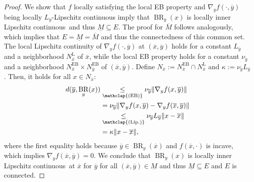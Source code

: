 \documentclass{article}
\newcommand{\lilc}{locally inner Lipschitz continuous}
\DeclareMathOperator{\BR}{BR}
\begin{document}
\begin{proof}
    We show that $f$ locally satisfying the local EB property and $\nabla_y f(\cdot,\overline{y})$ being locally $L_{\overline{y}}$-Lipschitz continuous imply that $\BR_y(x)$ is \lilc\ and thus $\underline{M}\subseteq E$. The proof for $\overline{M}$ follows analogously, which implies that $E=\underline{M}=\overline{M}$ and thus the connectedness of this common set. The local Lipschitz continuity of $\nabla_y f(\cdot,\overline{y})$ at $(\overline{x},\overline{y})$ holds for a constant $L_{\overline{y}}$ and a neighborhood $N_{\overline{x}}^{\text{L}}$ of $\overline{x}$, while the local EB property holds for a constant $\nu_{\overline{y}}$ and a neighborhood $N_{\overline{x}}^{\text{EB}}\times N_{\overline{y}}^{\text{EB}}$ of $(\overline{x},\overline{y})$. Define $N_{\overline{x}}:=N_{\overline{x}}^{\text{EB}}\cap N_{\overline{x}}^{\text{L}}$ and $\kappa:= \nu_{\overline{y}} L_{\overline{y}}$. Then, it holds for all $x\in N_{\overline{x}}$:
    \begin{align*}
        d(\overline{y},\BR_y(x)) &\underset{\mathclap{(\text{EB})}}{\leq} \nu_{\overline{y}} \|\nabla_y f(x,\overline{y})\| \\
        &= \nu_{\overline{y}} \|\nabla_y f(x,\overline{y})-\nabla_y f(\overline{x},\overline{y})\| \\
        & \underset{\mathclap{\text{(Lip.)}}}{\leq} \nu_{\overline{y}} L_{\overline{y}} \|x-\overline{x}\| \\
        & = \kappa \|x-\overline{x}\|,
    \end{align*}
    where the first equality holds because $\overline{y}\in \BR_y(\overline{x})$ and $f(\overline{x},\cdot)$ is incave, which implies $\nabla_y f(\overline{x},\overline{y})=0$.
   We conclude that $\BR_y(x)$ is \lilc\ at $\overline{x}$ for $\overline{y}$ for all $(\overline{x},\overline{y})\in \underline{M}$ and thus $\underline{M}\subseteq E$ and $E$ is connected.
\end{proof}
\end{document}

